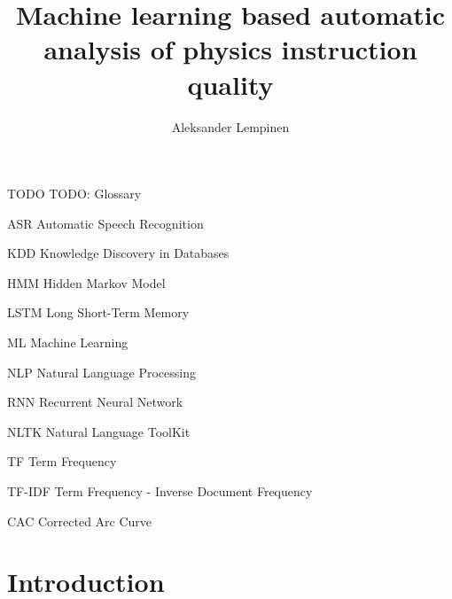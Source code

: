\documentclass[utf8,english]{gradu3}
\begin{document}
\title{Machine learning based automatic analysis of physics instruction quality}

\author{Aleksander Lempinen}



\maketitle

\begin{thetermlist}
\item[TODO] TODO: Glossary
\item[ASR] Automatic Speech Recognition
\item[KDD] Knowledge Discovery in Databases 
\item[HMM] Hidden Markov Model
\item[LSTM] Long Short-Term Memory 
\item[ML] Machine Learning
\item[NLP] Natural Language Processing
\item[RNN] Recurrent Neural Network
\item[NLTK] Natural Language ToolKit
\item[TF] Term Frequency
\item[TF-IDF] Term Frequency - Inverse Document Frequency 
\item[CAC] Corrected Arc Curve 
\end{thetermlist}

\mainmatter




\chapter{Introduction}
\end{document}
